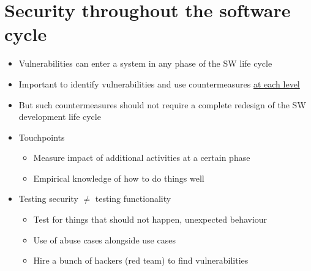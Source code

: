 \documentclass[12pt,titlepage,a4paper]{report}
\begin{document}
	\section{Security throughout the software cycle}
	\begin{itemize}
		\item Vulnerabilities can enter a system in any phase of the SW life cycle
		\item Important to identify vulnerabilities and use countermeasures \underline{at each level}
		\item But such countermeasures should not require a complete redesign of the SW development life cycle
		\item Touchpoints
		\begin{itemize}
			\item Measure impact of additional activities at a certain phase
			\item Empirical knowledge of how to do things well
		\end{itemize}
		\item Testing security $\neq$ testing functionality
		\begin{itemize}
			\item Test for things that should not happen, unexpected behaviour
			\item Use of abuse cases alongside use cases
			\item Hire a bunch of hackers (red team) to find vulnerabilities
		\end{itemize}
	\end{itemize}
\end{document}
